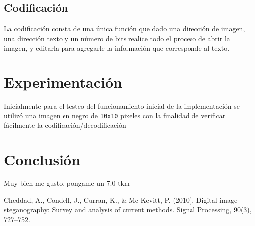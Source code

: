 \documentclass{article}
\begin{document}
	\subsection*{Codificación}
	 	La codificación consta de una única función que dado una dirección de imagen, una dirección texto y un número de bits realice todo el proceso de abrir la imagen, y editarla para agregarle la información que corresponde al texto.
	 
	
\section*{Experimentación}
    Inicialmente para el testeo del funcionamiento inicial de la implementación se utilizó una imagen en negro de \texttt{10x10} pixeles con la finalidad de verificar fácilmente la codificación/decodificación.

\section*{Conclusión}
	Muy bien me gusto, pongame un 7.0 tkm


\begin{thebibliography}{99}
     Cheddad, A., Condell, J., Curran, K., & Mc Kevitt, P. (2010). Digital image steganography: Survey and analysis of current methods. Signal Processing, 90(3), 727–752. 


\end{thebibliography}
\end{document}
